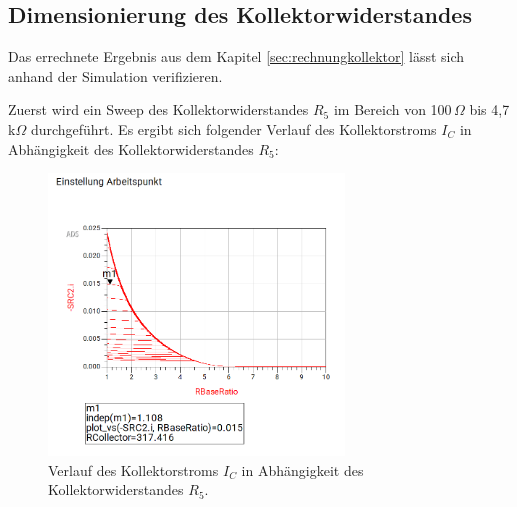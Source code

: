 \subsection{Dimensionierung des Kollektorwiderstandes}
\label{sec:dimensionierung_kollektorwiderstand}
%
%

Das errechnete Ergebnis aus dem Kapitel \ref{sec:rechnungkollektor} lässt sich anhand der Simulation verifizieren. 

Zuerst wird ein Sweep des Kollektorwiderstandes $R_5$ im Bereich von 100\,\(\Omega\) bis 4,7\,k\(\Omega\) durchgeführt.
Es ergibt sich folgender Verlauf des Kollektorstroms $I_C$ in Abhängigkeit des Kollektorwiderstandes $R_5$:
\begin{figure}[H]
    \centering
    \includegraphics[width=0.7\textwidth]{Pictures/RCollector.png}
    \caption{Verlauf des Kollektorstroms $I_C$ in Abhängigkeit des Kollektorwiderstandes $R_5$.}
    \label{fig:RCollector}
\end{figure}

